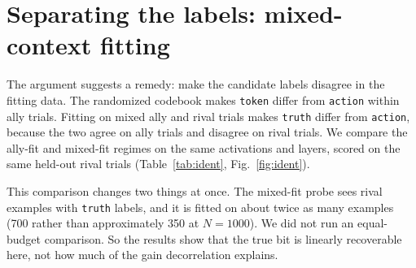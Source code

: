 \documentclass{article}
\begin{document}
\section{Separating the labels: mixed-context fitting}
\label{sec:constructive}

The argument suggests a remedy: make the candidate labels disagree in the fitting data. The randomized codebook makes \texttt{token} differ from \texttt{action} within ally trials. Fitting on mixed ally and rival trials makes \texttt{truth} differ from \texttt{action}, because the two agree on ally trials and disagree on rival trials. We compare the ally-fit and mixed-fit regimes on the same activations and layers, scored on the same held-out rival trials (Table~\ref{tab:ident}, Fig.~\ref{fig:ident}).

This comparison changes two things at once. The mixed-fit probe sees rival examples with \texttt{truth} labels, and it is fitted on about twice as many examples (700 rather than approximately 350 at $N=1000$). We did not run an equal-budget comparison. So the results show that the true bit is linearly recoverable here, not how much of the gain decorrelation explains.
\end{document}
